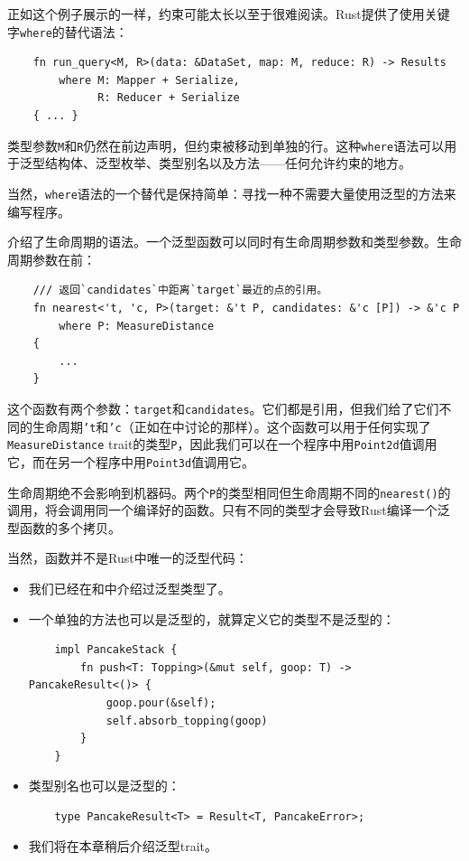 正如这个例子展示的一样，约束可能太长以至于很难阅读。Rust提供了使用关键字\texttt{where}的替代语法：
\begin{verbatim}
    fn run_query<M, R>(data: &DataSet, map: M, reduce: R) -> Results
        where M: Mapper + Serialize,
              R: Reducer + Serialize
    { ... }
\end{verbatim}

类型参数\texttt{M}和\texttt{R}仍然在前边声明，但约束被移动到单独的行。这种\texttt{where}语法可以用于泛型结构体、泛型枚举、类型别名以及方法——任何允许约束的地方。

当然，\texttt{where}语法的一个替代是保持简单：寻找一种不需要大量使用泛型的方法来编写程序。

介绍了生命周期的语法。一个泛型函数可以同时有生命周期参数和类型参数。生命周期参数在前：
\begin{verbatim}
    /// 返回`candidates`中距离`target`最近的点的引用。
    fn nearest<'t, 'c, P>(target: &'t P, candidates: &'c [P]) -> &'c P
        where P: MeasureDistance
    {
        ...
    }
\end{verbatim}

这个函数有两个参数：\texttt{target}和\texttt{candidates}。它们都是引用，但我们给了它们不同的生命周期\texttt{'t}和\texttt{'c}（正如在中讨论的那样）。这个函数可以用于任何实现了\texttt{MeasureDistance} trait的类型\texttt{P}，因此我们可以在一个程序中用\texttt{Point2d}值调用它，而在另一个程序中用\texttt{Point3d}值调用它。

生命周期绝不会影响到机器码。两个\texttt{P}的类型相同但生命周期不同的\texttt{nearest()}的调用，将会调用同一个编译好的函数。只有不同的类型才会导致Rust编译一个泛型函数的多个拷贝。

当然，函数并不是Rust中唯一的泛型代码：
\begin{itemize}
    \item 我们已经在和中介绍过泛型类型了。
    \item 一个单独的方法也可以是泛型的，就算定义它的类型不是泛型的：
    \begin{verbatim}
    impl PancakeStack {
        fn push<T: Topping>(&mut self, goop: T) -> PancakeResult<()> {
            goop.pour(&self);
            self.absorb_topping(goop)
        }
    }
    \end{verbatim}
    \item 类型别名也可以是泛型的：
    \begin{verbatim}
    type PancakeResult<T> = Result<T, PancakeError>;
    \end{verbatim}
    \item 我们将在本章稍后介绍泛型trait。
\end{itemize}

